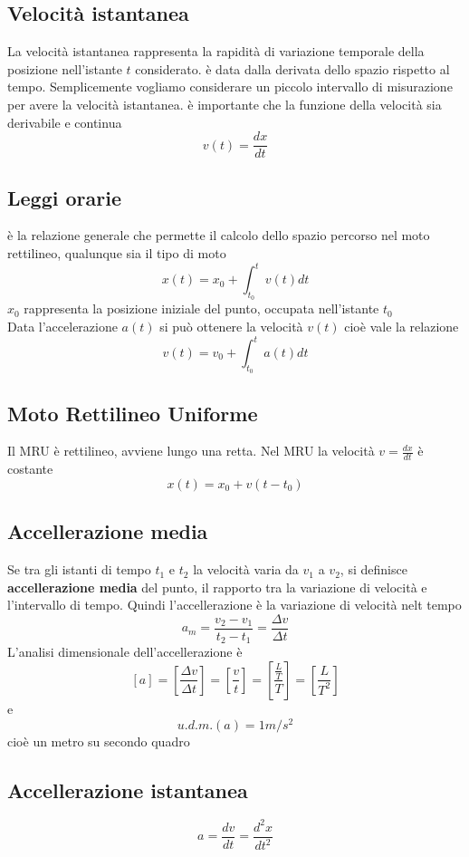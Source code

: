 \documentclass[a4paper]{report}
\begin{document}
  \subsection{Velocità istantanea}
  La velocità istantanea  rappresenta la rapidità di variazione temporale della posizione nell'istante $t$ considerato. è data dalla derivata dello spazio rispetto al tempo. Semplicemente vogliamo considerare un piccolo intervallo di misurazione per avere la velocità istantanea. è importante che la funzione della velocità sia derivabile e continua
  $$ v(t) = \frac{dx}{dt} $$
  \subsection{Leggi orarie}
  è la relazione generale che permette il calcolo dello spazio percorso nel moto rettilineo, qualunque sia il tipo di moto
  $$ x(t) = x_0 + \int_{t_0}^t v(t) dt $$
  $x_0$ rappresenta la posizione iniziale del punto, occupata nell'istante $t_0$
  \\
    Data l'accelerazione $a(t)$ si può ottenere la velocità $v(t)$ cioè vale la relazione
  $$ v(t) = v_0 + \int_{t_0}^t a(t) dt$$

  \subsection{Moto Rettilineo Uniforme}
  Il MRU è rettilineo, avviene lungo una retta. Nel MRU la velocità $v = \frac{dx}{dt}$ è costante
  $$ x(t) = x_0 + v(t-t_0)$$

  \subsection{Accellerazione media}
  Se tra gli istanti di tempo $t_1$ e $t_2$ la velocità varia da $v_1$ a $v_2$, si definisce \textbf{accellerazione media} del punto, il rapporto tra la variazione di velocità e l'intervallo di tempo. Quindi l'accellerazione è la variazione di velocità nelt tempo
  $$ a_m = \frac{v_2-v_1}{t_2-t_1} = \frac{\Delta v}{\Delta t} $$
  L'analisi dimensionale dell'accellerazione è
  $$[a] = [\frac{\Delta v}{\Delta t}] = [\frac{v}{t}] = [\frac{\frac{L}{T}}{T}] = [\frac{L}{T^2}]$$
  e $$u.d.m.(a) = 1m/s^2$$ cioè un metro su secondo quadro

  \subsection{Accellerazione istantanea}
  $$ a = \frac{dv}{dt} = \frac{d^2x}{dt^2} $$
\end{document}
